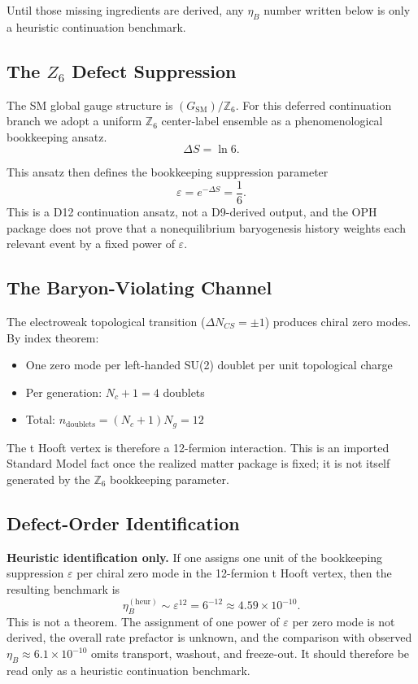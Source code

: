 Until those missing ingredients are derived, any \(\eta_B\) number written below is only a heuristic continuation benchmark.

\subsection{\texorpdfstring{The \(Z_6\) Defect Suppression}{The Z6 Defect Suppression}}\label{111-the-zux2086-defect-suppression}

The SM global gauge structure is \((G_{\text{SM}})/\mathbb{Z}_6\). For this deferred continuation branch we adopt a uniform \(\mathbb{Z}_6\) center-label ensemble as a phenomenological bookkeeping ansatz.
\[
\Delta S = \ln 6.
\]

This ansatz then defines the bookkeeping suppression parameter
\[
\varepsilon = e^{-\Delta S} = \frac{1}{6}.
\]
This is a D12 continuation ansatz, not a D9-derived output, and the OPH package does not prove that a nonequilibrium baryogenesis history weights each relevant event by a fixed power of \(\varepsilon\).

\subsection{The Baryon-Violating Channel}\label{112-the-baryon-violating-channel}

The electroweak topological transition (\(\Delta N_{CS} = \pm 1\)) produces chiral zero modes. By index theorem:

\begin{itemize}
\tightlist
\item
 One zero mode per left-handed SU(2) doublet per unit topological charge
\item
 Per generation: \(N_c + 1 = 4\) doublets
\item
 Total: \(n_{\text{doublets}} = (N_c + 1)N_g = 12\)
\end{itemize}

The \textquotesingle t Hooft vertex is therefore a 12-fermion interaction. This is an imported Standard Model fact once the realized matter package is fixed; it is not itself generated by the \(\mathbb{Z}_6\) bookkeeping parameter.

\subsection{Defect-Order Identification}\label{113-defect-order-identification}

\textbf{Heuristic identification only.} If one assigns one unit of the bookkeeping suppression \(\varepsilon\) per chiral zero mode in the 12-fermion \textquotesingle t Hooft vertex, then the resulting benchmark is
\[
\eta_B^{(\mathrm{heur})} \sim \varepsilon^{12} = 6^{-12} \approx 4.59 \times 10^{-10}.
\]
This is not a theorem. The assignment of one power of \(\varepsilon\) per zero mode is not derived, the overall rate prefactor is unknown, and the comparison with observed \(\eta_B \approx 6.1 \times 10^{-10}\) omits transport, washout, and freeze-out. It should therefore be read only as a heuristic continuation benchmark.

